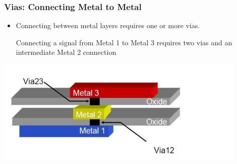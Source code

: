 \documentclass[compress]{beamer}
\begin{document}
	\begin{frame}
		\frametitle{Vias: Connecting Metal to Metal}
			\begin{itemize}
				\item Connecting between metal layers requires one or more vias.
				\begin{example}
					Connecting a signal from Metal 1 to Metal 3 requires
					two vias and an intermediate Metal 2 connection
				\end{example}
			\end{itemize}	
			\begin{center}
				\includegraphics[width=0.9\textwidth]{VIA}
			\end{center}
	\end{frame}
\end{document}
